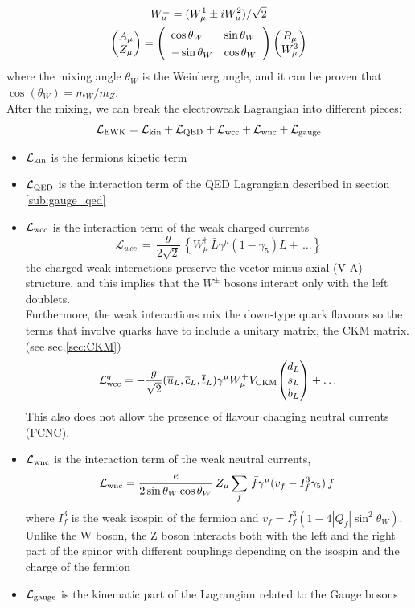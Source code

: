\begin{gather}
    W_\mu^{\pm}=(W^1_\mu\pm i W^2_\mu)/\sqrt{2}\\
    \db{A_\mu}{Z_\mu}=\left(\begin{array}{l l}{{\cos\theta_{W}}}&{{\sin\theta_{W}}}\\ {{-\sin\theta_{W}}}&{{\cos\theta_{W}}}\end{array}\right)\db{B_\mu}{W^3_\mu}
\end{gather}
where the mixing angle $\theta_W$ is the Weinberg angle, and it can be proven that $\cos(\theta_W)=m_W/m_Z$.\\
After the mixing, we can break the electroweak Lagrangian into different pieces:
\begin{equation}\label{eq:EWK}
    \mathcal{L}_\text{EWK}=\mathcal{L}_\text{kin}+\mathcal{L}_\text{QED}+\mathcal{L}_\text{wcc}+\mathcal{L}_\text{wnc}+\mathcal{L}_\text{gauge}
\end{equation}

\begin{itemize}
    \item  $\mathcal{L}_\text{kin}$ is the fermions kinetic term
    \item $\mathcal{L}_\text{QED}$ is the interaction term of the QED Lagrangian described in section \ref{sub:gauge_qed}
    \item $\mathcal{L}_\text{wcc}$ is the interaction term of the weak charged currents
    \begin{equation}
        {\mathcal{L}}_{wcc}\,=\,\frac{g}{2{\sqrt{2}}}\,\left\{W_{\mu}^{\dagger}\,\bar{L}\gamma^{\mu}(1-\gamma_{5})L+\,\dots \right\}
    \end{equation}
    the charged weak interactions preserve the vector minus axial (V-A) structure, and this implies that the $W^\pm$ bosons interact only with the left doublets.\\
    Furthermore, the weak interactions mix the down-type quark flavours so the terms that involve quarks have to include a unitary matrix, the CKM matrix. (see sec.\ref{sec:CKM})
    \begin{equation}
        \Lg{wcc}^q=-\frac{g}{\sqrt{2}}(\overline{{{u}}}_{L},\overline{{{c}}}_{L},\overline{{{t}}}_{L})\gamma^{\mu}W_{\mu}^{+}V_{\mathrm{CKM}}\tb{d_{L}}{s_{L}}{b_L}+\dots
    \end{equation}
    This also does not allow the presence of flavour changing neutral currents (FCNC).
    \item $\mathcal{L}_\text{wnc}$ is the interaction term of the weak neutral currents,
    \begin{equation}
        \mathcal{L}_\text{wnc}=\frac{e}{2\sin\theta_{W}\cos\theta_{W}}\,Z_{\mu}\sum_{f}\,\bar{f}\gamma^{\mu}(v_{f}-I^3_{f}\gamma_{5})\,f\;
    \end{equation}
    where $I^3_f$ is the weak isospin of the fermion and $v_f=I^{3}_{f}\left(1-4|Q_{f}|\sin^{2}\theta_{W}\right)$.
    Unlike the W boson, the Z boson interacts both with the left and the right part of the spinor with different couplings depending on the isospin and the charge of the fermion 
    \item $\mathcal{L}_\text{gauge}$ is the kinematic part of the Lagrangian related to the Gauge bosons
\end{itemize}


